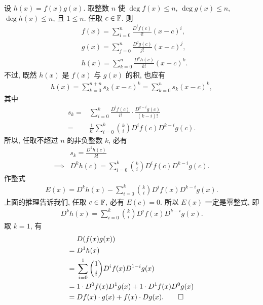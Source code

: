 \begin{pf}
    设 $h(x) = f(x)g(x)$. 取整数 $n$ 使 $\deg f(x) \leq n$, $\deg g(x) \leq n$, $\deg h(x) \leq n$, 且 $1 \leq n$. 任取 $c \in \mathbb{F}$. 则
    \begin{align*}
         & f(x) = \sum_{i = 0}^{n} \frac{D^i f(c)}{i!} (x-c)^i, \\
         & g(x) = \sum_{j = 0}^{n} \frac{D^j g(c)}{j!} (x-c)^j, \\
         & h(x) = \sum_{k = 0}^{n} \frac{D^k h(c)}{k!} (x-c)^k.
    \end{align*}
    不过, 既然 $h(x)$ 是 $f(x)$ 与 $g(x)$ 的积, 也应有
    \begin{align*}
        h(x) = \sum_{k = 0}^{n+n} s_k (x-c)^k = \sum_{k = 0}^{n} s_k (x-c)^k,
    \end{align*}
    其中
    \begin{align*}
        s_k
        = {} & \sum_{i = 0}^{k} \frac{D^i f(c)}{i!} \cdot \frac{D^{k-i} g(c)}{(k-i)!} \\
        = {} & \frac{1}{k!} \sum_{i = 0}^{k} \binom{k}{i} D^i f(c) D^{k-i} g(c).
    \end{align*}
    所以, 任取不超过 $n$ 的非负整数 $k$, 必有
    \begin{align*}
                 & s_k = \frac{D^k h(c)}{k!}                                       \\
        \implies & D^k h(c) = \sum_{i = 0}^{k} \binom{k}{i} D^i f(c) D^{k-i} g(c).
    \end{align*}
    作整式
    \begin{align*}
        E(x) = D^k h(x) - \sum_{i = 0}^{k} \binom{k}{i} D^i f(x) D^{k-i} g(x).
    \end{align*}
    上面的推理告诉我们, 任取 $c \in \mathbb{F}$, 必有 $E(c) = 0$. 所以 $E(x)$ 一定是零整式, 即
    \begin{align*}
        D^k h(x) = \sum_{i = 0}^{k} \binom{k}{i} D^i f(x) D^{k-i} g(x).
    \end{align*}
    取 $k=1$, 有
    \begin{align*}
             & D (f(x)g(x))                                          \\
        = {} & D^1 h(x)                                              \\
        = {} & \sum_{i = 0}^{1} \binom{1}{i} D^i f(x) D^{1-i} g(x)   \\
        = {} & 1 \cdot D^0 f(x) D^1 g(x) + 1 \cdot D^1 f(x) D^0 g(x) \\
        = {} & Df(x) \cdot g(x) + f(x) \cdot Dg(x). \qedhere
    \end{align*}
\end{pf}

